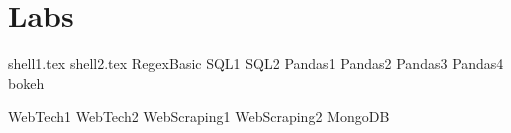 \documentclass[nociteref]{SIAM-GH-book}
\begin{document}
\setcounter{tocdepth}{1}
\tableofcontents

\mainmatter %

\part{Labs} %
{shell1.tex}
{shell2.tex}
{RegexBasic}
{SQL1}
{SQL2}
{Pandas1}
{Pandas2}
{Pandas3}
{Pandas4}
{bokeh}

{WebTech1}
{WebTech2}
{WebScraping1}
{WebScraping2}
{MongoDB}
\end{document}
